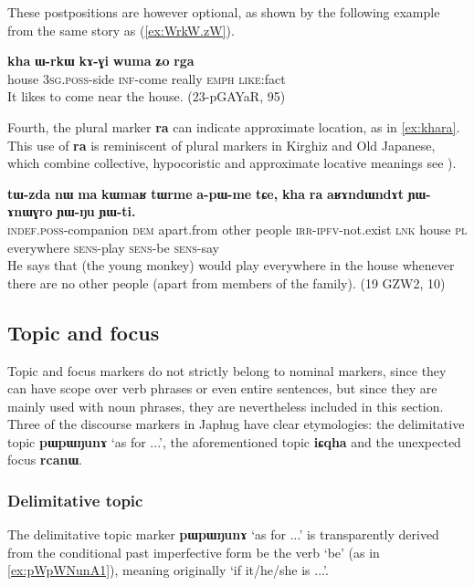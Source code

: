\documentclass[oldfontcommands,oneside,a4paper,11pt]{article}
\newcommand{\ipa}[1]{\mbox{\phon\textbf{#1}}} %
\begin{document}
These postpositions are however optional, as shown by the following example from the same story as (\ref{ex:WrkW.zW}).

\begin{exe}
\ex \label{ex:kha.WrkW}
\gll
\ipa{kha} 	\ipa{ɯ-rkɯ} 	\ipa{kɤ-ɣi} 	\ipa{wuma} 	\ipa{ʑo} 	\ipa{rga} \\
house \textsc{3sg.poss}-side  \textsc{inf}-come really \textsc{emph} \textsc{like}:fact \\
\glt It likes to come near the house. (23-pGAYaR, 95)
\end{exe}

Fourth, the plural marker \ipa{ra} can indicate approximate location, as in \ref{ex:khara}. This use of \ipa{ra} is reminiscent of plural markers in Kirghiz and Old Japanese, which combine collective, hypocoristic and approximate locative meanings see \citealt[195]{antonov07ra}).

\begin{exe}
\ex \label{ex:khara}
\gll
\ipa{tɯ-zda} 	\ipa{nɯ} 	\ipa{ma} 	\ipa{kɯmaʁ} 	\ipa{tɯrme} 	\ipa{a-pɯ-me} 	\ipa{tɕe,} 	\ipa{kha} 	\ipa{ra} 	\ipa{aʁɤndɯndɤt} \ipa{ɲɯ-ɤnɯɣro} 	\ipa{ɲɯ-ŋu} 	\ipa{ɲɯ-ti.} \\
\textsc{indef.poss}-companion \textsc{dem} apart.from other people \textsc{irr-ipfv}-not.exist \textsc{lnk} house \textsc{pl} everywhere \textsc{sens}-play \textsc{sens}-be \textsc{sens}-say \\
\glt He says that (the young monkey) would play everywhere in the house whenever there are no other people (apart from members of the family). (19 GZW2, 10)
\end{exe}


   \subsection{Topic and focus} \label{sec:topic}
Topic and focus markers do not strictly belong to nominal markers, since they can have scope over verb phrases or even entire sentences, but since they are mainly used with noun phrases, they are nevertheless included in this section. Three of the discourse markers in Japhug have clear etymologies: the delimitative topic \ipa{pɯpɯŋunɤ} `as for ...', the aforementioned topic \ipa{iɕqha} and the unexpected focus \ipa{rcanɯ}.

  \subsubsection{Delimitative topic}
The delimitative topic marker \ipa{pɯpɯŋunɤ} `as for ...' is transparently derived from the conditional past imperfective form be the verb `be' (as in \ref{ex:pWpWNunA1}), meaning originally `if it/he/she is ...'.
\end{document}
